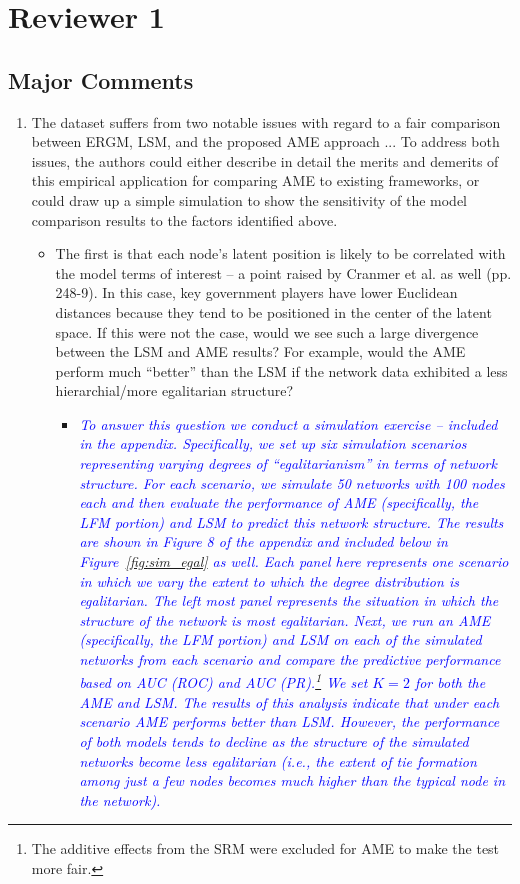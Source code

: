 \section{Reviewer 1}

\subsection{Major Comments}

\begin{enumerate}
	\item  The dataset suffers from two notable issues with regard to a fair comparison between ERGM, LSM, and the proposed AME approach ... To address both issues, the authors could either describe in detail the merits and demerits of this empirical application for comparing AME to existing frameworks, or could draw up a simple simulation to show the sensitivity of the model comparison results to the factors identified above.
	\begin{itemize}
		\item The first is that each node’s latent position is likely to be correlated with the model terms of interest – a point raised by Cranmer et al. as well (pp. 248-9). In this case, key government players have lower Euclidean distances because they tend to be positioned in the center of the latent space. If this were not the case, would we see such a large divergence between the LSM and AME results? For example, would the AME perform much ``better'' than the LSM if the network data exhibited a less hierarchial/more egalitarian structure? 
			\begin{itemize}
				\item \textcolor{blue}{ \emph{
				To answer this question we conduct a simulation exercise -- included in the appendix. Specifically, we set up six simulation scenarios representing varying degrees of ``egalitarianism'' in terms of network structure. For each scenario, we simulate 50 networks with 100 nodes each and then evaluate the performance of AME (specifically, the LFM portion) and LSM to predict this network structure. The results are shown in Figure 8 of the appendix and included below in Figure~\ref{fig:sim_egal} as well. Each panel here represents one scenario in which we vary the extent to which the degree distribution is egalitarian. The left most panel represents the situation in which the structure of the network is most egalitarian. Next, we run an AME (specifically, the LFM portion) and LSM on each of the simulated networks from each scenario and compare the predictive performance based on AUC (ROC) and AUC (PR).\footnote{The additive effects from the SRM were excluded for AME to make the test more fair.} We set $K=2$ for both the AME and LSM. The results of this analysis indicate that under each scenario AME performs better than LSM. However, the performance of both models tends to decline as the structure of the simulated networks become less egalitarian (i.e., the extent of tie formation among just a few nodes becomes much higher than the typical node in the network).  
}}
\end{itemize}
\end{itemize}
\end{enumerate}
